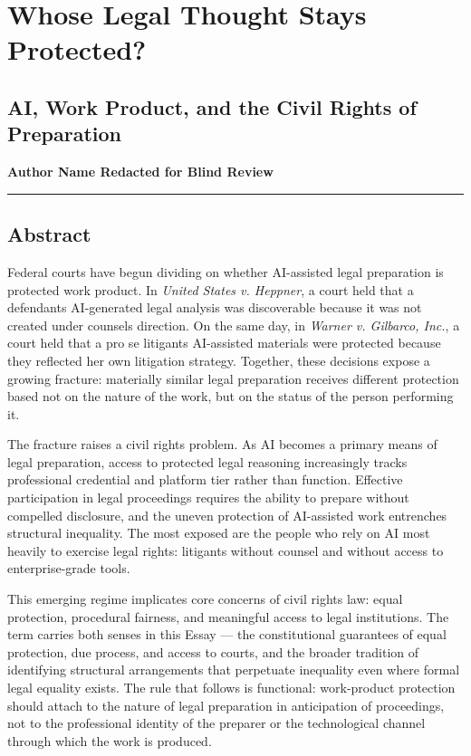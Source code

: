 \documentclass[
  12pt,
]{article}
\author{}
\date{}
\begin{document}
\section{Whose Legal Thought Stays
Protected?}\label{whose-legal-thought-stays-protected}

\subsection{AI, Work Product, and the Civil Rights of
Preparation}\label{ai-work-product-and-the-civil-rights-of-preparation}

\textbf{Author Name Redacted for Blind Review}

\begin{center}\rule{0.5\linewidth}{0.5pt}\end{center}

\subsection{Abstract}\label{abstract}

Federal courts have begun dividing on whether AI-assisted legal
preparation is protected work product. In \emph{United States v.
Heppner}, a court held that a defendant\textquotesingle s AI-generated
legal analysis was discoverable because it was not created under
counsel\textquotesingle s direction. On the same day, in \emph{Warner v.
Gilbarco, Inc.}, a court held that a pro se litigant\textquotesingle s
AI-assisted materials were protected because they reflected her own
litigation strategy. Together, these decisions expose a growing
fracture: materially similar legal preparation receives different
protection based not on the nature of the work, but on the status of the
person performing it.

The fracture raises a civil rights problem. As AI becomes a primary means
of legal preparation, access to protected legal reasoning increasingly
tracks professional credential and platform tier rather than function.
Effective participation in legal proceedings requires the ability to
prepare without compelled disclosure, and the uneven protection of
AI-assisted work entrenches structural inequality. The most exposed are
the people who rely on AI most heavily to exercise legal rights:
litigants without counsel and without access to enterprise-grade tools.

This emerging regime implicates core concerns of civil rights law: equal
protection, procedural fairness, and meaningful access to legal
institutions. The term carries both senses in this Essay --- the
constitutional guarantees of equal protection, due process, and access
to courts, and the broader tradition of identifying structural
arrangements that perpetuate inequality even where formal legal equality
exists. The rule that follows is functional: work-product protection
should attach to the nature of legal preparation in anticipation of
proceedings, not to the professional identity of the preparer or the
technological channel through which the work is produced.
\end{document}
